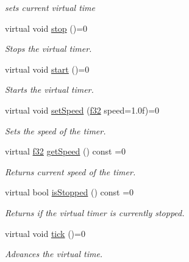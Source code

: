 \begin{DoxyCompactItemize}
\begin{DoxyCompactList}\small\item\em sets current virtual time \end{DoxyCompactList}\item 
virtual void \hyperlink{classirr_1_1ITimer_a649e7294fafc6e6de00f9a4dc6894c16}{stop} ()=0
\begin{DoxyCompactList}\small\item\em Stops the virtual timer. \end{DoxyCompactList}\item 
virtual void \hyperlink{classirr_1_1ITimer_a9467dc5a72de3869712715d0473c9697}{start} ()=0
\begin{DoxyCompactList}\small\item\em Starts the virtual timer. \end{DoxyCompactList}\item 
virtual void \hyperlink{classirr_1_1ITimer_a13f3f4919a3431733bc90cd87d110675}{set\+Speed} (\hyperlink{namespaceirr_a0277be98d67dc26ff93b1a6a1d086b07}{f32} speed=1.\+0f)=0
\begin{DoxyCompactList}\small\item\em Sets the speed of the timer. \end{DoxyCompactList}\item 
virtual \hyperlink{namespaceirr_a0277be98d67dc26ff93b1a6a1d086b07}{f32} \hyperlink{classirr_1_1ITimer_a2f5bea821b9dd3546c948d4fda7fdff0}{get\+Speed} () const  =0
\begin{DoxyCompactList}\small\item\em Returns current speed of the timer. \end{DoxyCompactList}\item 
virtual bool \hyperlink{classirr_1_1ITimer_a0b9a8a09ad7383e7d105f841af8784f8}{is\+Stopped} () const  =0\hypertarget{classirr_1_1ITimer_a0b9a8a09ad7383e7d105f841af8784f8}{}\label{classirr_1_1ITimer_a0b9a8a09ad7383e7d105f841af8784f8}

\begin{DoxyCompactList}\small\item\em Returns if the virtual timer is currently stopped. \end{DoxyCompactList}\item 
virtual void \hyperlink{classirr_1_1ITimer_a50ee793711cace4410e1f9c9e1ce20c6}{tick} ()=0
\begin{DoxyCompactList}\small\item\em Advances the virtual time. \end{DoxyCompactList}\end{DoxyCompactItemize}
